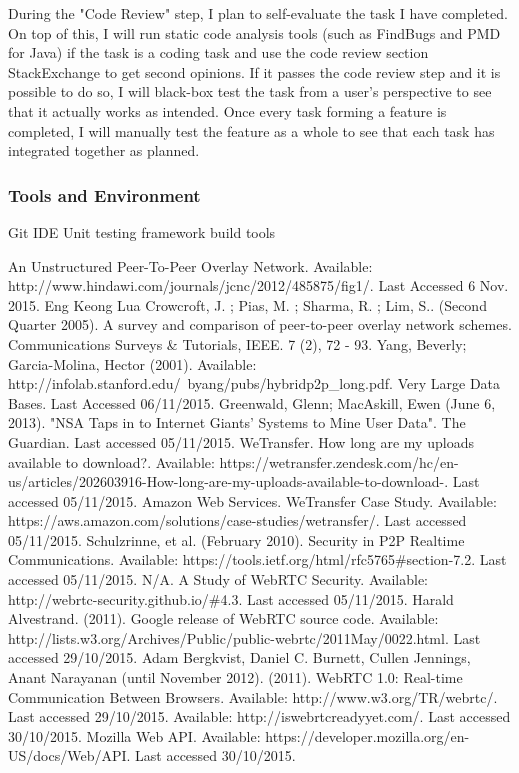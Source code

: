 \documentclass[]{report}
\begin{document}
		During the "Code Review" step, I plan to self-evaluate the task I have completed. On top of this, I will run static code analysis tools (such as FindBugs and PMD for Java) if the task is a coding task and use the code review section StackExchange to get second opinions. If it passes the code review step and it is possible to do so, I will black-box test the task from a user's perspective to see that it actually works as intended. Once every task forming a feature is completed, I will manually test the feature as a whole to see that each task has integrated together as planned.
		
		\subsubsection*{Tools and Environment}
		Git
		IDE
		Unit testing framework
		build tools
		
	\begin{thebibliography}{20}
		An Unstructured Peer-To-Peer Overlay Network. Available:
		http://www.hindawi.com/journals/jcnc/2012/485875/fig1/. Last Accessed 6 Nov. 2015.
		Eng Keong Lua Crowcroft, J. ; Pias, M. ; Sharma, R. ; Lim, S.. (Second Quarter 2005). A survey and comparison of peer-to-peer overlay network schemes. Communications Surveys \& Tutorials, IEEE. 7 (2), 72 - 93.
		Yang, Beverly; Garcia-Molina, Hector (2001). Available: http://infolab.stanford.edu/~byang/pubs/hybridp2p\_long.pdf. Very Large Data Bases. Last Accessed 06/11/2015.
		Greenwald, Glenn; MacAskill, Ewen (June 6, 2013). "NSA Taps in to Internet Giants' Systems to Mine User Data". The Guardian.  Last accessed 05/11/2015.
		WeTransfer. How long are my uploads available to download?. Available: https://wetransfer.zendesk.com/hc/en-us/articles/202603916-How-long-are-my-uploads-available-to-download-. Last accessed 05/11/2015.
		Amazon Web Services. WeTransfer Case Study. Available: https://aws.amazon.com/solutions/case-studies/wetransfer/. Last accessed 05/11/2015.
		Schulzrinne, et al. (February 2010). Security in P2P Realtime Communications. Available: https://tools.ietf.org/html/rfc5765\#section-7.2. Last accessed 05/11/2015.
		N/A. A Study of WebRTC Security. Available: http://webrtc-security.github.io/\#4.3. Last accessed 05/11/2015.
		Harald Alvestrand. (2011). Google release of WebRTC source code. Available: http://lists.w3.org/Archives/Public/public-webrtc/2011May/0022.html. Last accessed 29/10/2015.
		Adam Bergkvist, Daniel C. Burnett, Cullen Jennings, Anant Narayanan (until November 2012). (2011). WebRTC 1.0: Real-time Communication Between Browsers. Available: http://www.w3.org/TR/webrtc/. Last accessed 29/10/2015.
		Available: http://iswebrtcreadyyet.com/. Last accessed 30/10/2015.
		Mozilla Web API. Available: https://developer.mozilla.org/en-US/docs/Web/API. Last accessed 30/10/2015.
	\end{thebibliography}
\end{document}
